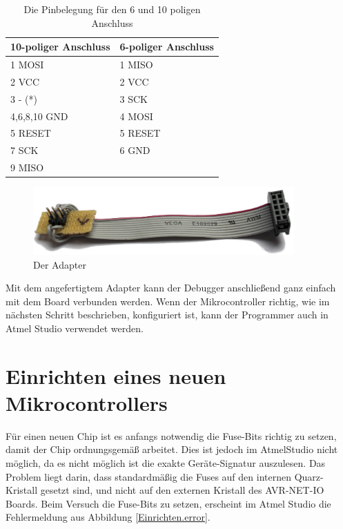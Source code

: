 \begin{table}[H]
\centering
\begin{tabular}{|l|l|} \hline
	 \textbf{10-poliger Anschluss} & \textbf{6-poliger Anschluss} \\ \hline
	 1 MOSI & 1 MISO \\ \hline
	 2 VCC & 2 VCC \\ \hline
	 3 - (*) & 3 SCK \\ \hline
	 4,6,8,10 GND & 4 MOSI \\ \hline
	 5 RESET & 5 RESET \\ \hline
	 7 SCK & 6 GND \\ \hline
	 9 MISO &   \\ \hline
\end{tabular}
\caption{Die Pinbelegung für den 6 und 10 poligen Anschluss \cite{mikrocontroller.isp}}
\label{pinbelegung}
\end{table}

\begin{figure}[htp]
\begin{center}
  \includegraphics[width=10cm]{content/pictures/Anleitung/adapter.jpg}
  \caption{Der Adapter}
  \label{adapter}
\end{center}
\end{figure}

Mit dem angefertigtem Adapter kann der Debugger anschließend ganz einfach mit
dem Board verbunden werden. Wenn der Mikrocontroller richtig, wie im nächsten Schritt
beschrieben, konfiguriert ist, kann der Programmer auch in Atmel Studio
verwendet werden.

\section{Einrichten eines neuen Mikrocontrollers}
\label{Chapt:Einrichten}

Für einen neuen Chip ist es anfangs notwendig die Fuse-Bits richtig zu setzen,
damit der Chip ordnungsgemäß arbeitet.
Dies ist jedoch im AtmelStudio nicht möglich, da es nicht möglich ist die exakte
Geräte-Signatur auszulesen.
Das Problem liegt darin, dass standardmäßig die Fuses auf den internen
Quarz-Kristall gesetzt sind, und nicht auf den externen Kristall des
AVR-NET-IO Boards.
Beim Versuch die Fuse-Bits zu setzen, erscheint im Atmel Studio die
Fehlermeldung aus Abbildung \ref{Einrichten.error}.

